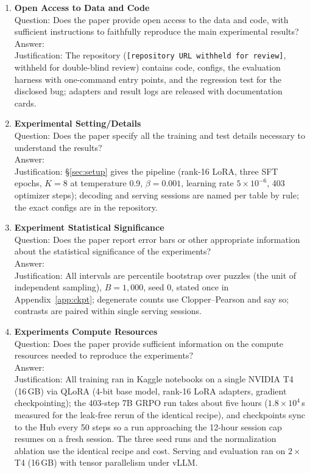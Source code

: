 \documentclass{article}
\newcommand{\repourl}{\texttt{[repository URL withheld for review]}}
\begin{document}
\begin{enumerate}
\item \textbf{Open Access to Data and Code}\\
Question: Does the paper provide open access to the data and code, with
sufficient instructions to faithfully reproduce the main experimental results?\\
Answer: \answerYes{}\\
Justification: The repository (\repourl{}, withheld for double-blind review)
contains code, configs, the evaluation harness with one-command entry points,
and the regression test for the disclosed bug; adapters and result logs are
released with documentation cards.

\item \textbf{Experimental Setting/Details}\\
Question: Does the paper specify all the training and test details necessary to
understand the results?\\
Answer: \answerYes{}\\
Justification: \S\ref{sec:setup} gives the pipeline (rank-16 LoRA, three SFT
epochs, $K=8$ at temperature 0.9, $\beta=0.001$, learning rate
$5\times10^{-6}$, 403 optimizer steps); decoding and serving sessions are
named per table by rule; the exact configs are in the repository.

\item \textbf{Experiment Statistical Significance}\\
Question: Does the paper report error bars or other appropriate information
about the statistical significance of the experiments?\\
Answer: \answerYes{}\\
Justification: All intervals are percentile bootstrap over puzzles (the unit
of independent sampling), $B=1{,}000$, seed 0, stated once in
Appendix~\ref{app:ckpt}; degenerate counts use Clopper--Pearson and say so;
contrasts are paired within single serving sessions.

\item \textbf{Experiments Compute Resources}\\
Question: Does the paper provide sufficient information on the compute
resources needed to reproduce the experiments?\\
Answer: \answerYes{}\\
Justification: All training ran in Kaggle notebooks on a single NVIDIA T4
(16\,GB) via QLoRA (4-bit base model, rank-16 LoRA adapters, gradient
checkpointing); the 403-step 7B GRPO run takes about five hours ($1.8\times10^{4}$\,s measured for the leak-free rerun of the identical recipe), and
checkpoints sync to the Hub every 50 steps so a run approaching the 12-hour
session cap resumes on a fresh session. The three seed runs and the
normalization ablation use the identical recipe and cost. Serving and
evaluation ran on $2\times$T4 (16\,GB) with tensor parallelism under vLLM.


\end{enumerate}
\end{document}
